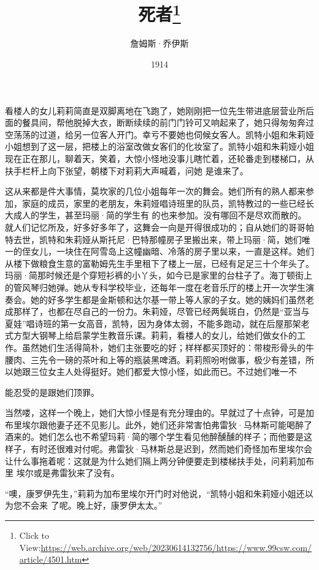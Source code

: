 \documentclass{article}
\title{死者\footnote{Click to View:\url{https://web.archive.org/web/20230614132756/https://www.99csw.com/article/4501.htm}}}
\author{詹姆斯·乔伊斯}
\date{1914}
\begin{document}

\maketitle


\Large

﻿看楼人的女儿莉莉简直是双脚离地在飞跑了，她刚刚把一位先生带进底层营业所后面的餐具间，帮他脱掉大衣，断断续续的前门门铃可又响起来了，她只得匆匆奔过空荡荡的过道，给另一位客人开门。幸亏不要她也伺候女客人。凯特小姐和朱莉娅小姐想到了这一层，把楼上的浴室改做女客们的化妆室了。凯特小姐和朱莉娅小姐现在正在那儿，聊着天，笑着，大惊小怪地没事儿瞎忙着，还轮番走到楼梯口，从扶手栏杆上向下张望，朝楼下对莉莉大声喊着，问她
是谁来了。 

这从来都是件大事情，莫坎家的几位小姐每年一次的舞会。她们所有的熟人都来参加，家庭的成员，家里的老朋友，朱莉娅唱诗班里的队员，凯特教过的一些已经长大成人的学生，甚至玛丽·简的学生有
\newpage
的也来参加。没有哪回不是尽欢而散的。就人们记忆所及，好多好多年了，这舞会一向是开得很成功的；自从她们的哥哥帕特去世，凯特和朱莉娅从斯托尼·巴特那幢房子里搬出来，带上玛丽·简，她们唯一的侄女儿，一块住在阿雪岛上这幢幽暗、冷落的房子里以来，一直是这样。她们从楼下做粮食生意的富勒姆先生手里租下了楼上一层，已经有足足三十个年头了。玛丽·简那时候还是个穿短衫裤的小丫头，如今已是家里的台柱子了。海丁顿街上的管风琴归她弹。她从专科学校毕业，还每年一度在老音乐厅的楼上开一次学生演奏会。她的好多学生都是金斯顿和达尔基一带上等人家的子女。她的姨妈们虽然老成那样了，也都在尽自己的一份力。朱莉娅，尽管已经两鬓斑白，仍然是“亚当与夏娃”唱诗班的第一女高音，凯特，因为身体太弱，不能多跑动，就在后屋那架老式方型大钢琴上给启蒙学生教音乐课。莉莉，看楼人的女儿，给她们做女仆的工作。虽然她们生活得简朴，她们主张要吃的好；样样都买顶好的：带梭形骨头的牛腰肉、三先令一磅的茶叶和上等的瓶装黑啤酒。莉莉照吩咐做事，极少有差错，所以她跟三位女主人处得挺好。她们都爱大惊小怪，如此而已。不过她们唯一不
\newpage

能忍受的是跟她们顶罪。 

当然喽，这样一个晚上，她们大惊小怪是有充分理由的。早就过了十点钟，可是加布里埃尔跟他妻子还不见影儿。此外，她们还非常害怕弗雷狄·马林斯可能喝醉了酒来的。她们怎么也不希望玛莉·简的哪个学生看见他醉醺醺的样子；而他要是这样子，有时还很难对付呢。弗雷狄·马林斯总是迟到，然而她们奇怪加布里埃尔会让什么事拖着呢：这就是为什么她们隔上两分钟便要走到楼梯扶手处，问莉莉加布里
埃尔或是弗雷狄来了没有。 

“噢，康罗伊先生，”莉莉为加布里埃尔开门时对他说，“凯特小姐和朱莉娅小姐还以为您不会来
了呢。晚上好，康罗伊太太。” 
\end{document}
